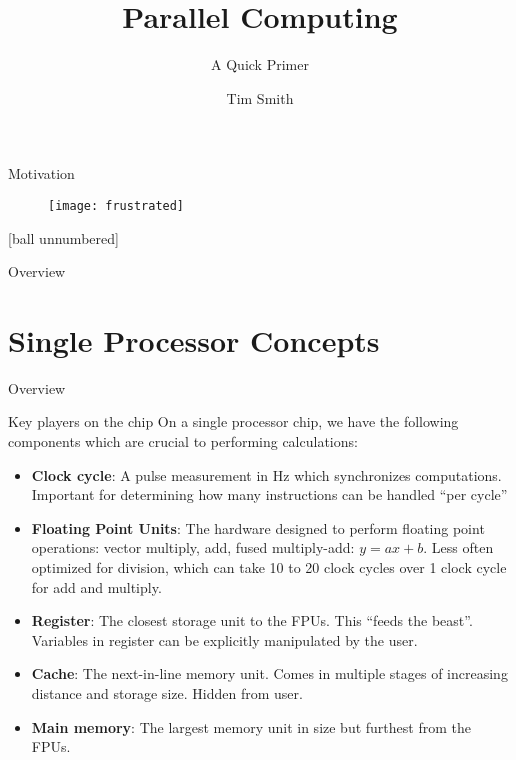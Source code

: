 \documentclass[pdf]{beamer}
\title{Parallel Computing}
\subtitle{A Quick Primer}
\author{Tim Smith}
\begin{document}
 \begin{frame}
  \titlepage
 \end{frame}

 \begin{frame}{Motivation}
  \begin{figure}
  \centering
  \texttt{[image: frustrated]}
  \end{figure}
 \end{frame}
 
 [ball unnumbered]
 \begin{frame}{Overview}

  \tableofcontents
 \end{frame}
 
 \section{Single Processor Concepts}
 \begin{frame}{Overview}
  \tableofcontents[currentsection]
 \end{frame}
 \begin{frame}[shrink=10]{Key players on the chip}
  On a single processor chip, we have the following components which are crucial to performing calculations:
  \begin{itemize} %
	\item \textbf{Clock cycle}: A pulse measurement in Hz which synchronizes computations. Important for determining how many instructions can be handled ``per cycle'' 
	\item \textbf{Floating Point Units}: The hardware designed to perform floating point operations: vector multiply, add, fused multiply-add: $y = ax + b$. Less often optimized for division, which can take 10 to 20 clock cycles over 1 clock cycle for add and multiply.
	\item \textbf{Register}: The closest storage unit to the FPUs. This ``feeds the beast''. Variables in register can be explicitly manipulated by the user.
	\item \textbf{Cache}: The next-in-line memory unit. Comes in multiple stages of increasing distance and storage size. Hidden from user. 
	\item \textbf{Main memory}: The largest memory unit in size but furthest from the FPUs. 

   \end{itemize}
  \end{frame}
\end{document}
